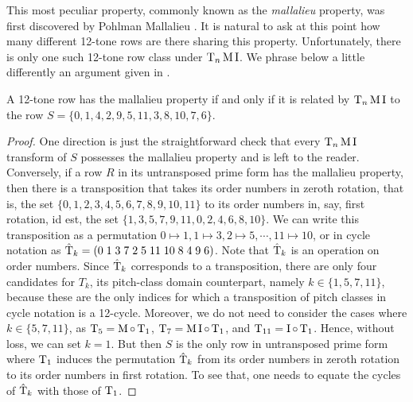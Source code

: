 This most peculiar property, commonly known as the \emph{mallalieu} property, was first discovered by Pohlman Mallalieu \cite[285]{Lewin1966}. It is natural to ask at this point how many different 12-tone rows are there sharing this property. Unfortunately, there is only one such 12-tone row class under $\operatorname{T}_n\operatorname{M}\operatorname{I}$. We phrase below a little differently an argument given in \cite[17]{Morris1976}.

\begin{proposition}
	\cite[17]{Morris1976}
	\label{morris-mallalieu}
	A 12-tone row has the mallalieu property if and only if it is related by $\operatorname{T}_n\operatorname{M}\operatorname{I}$ to the row $S = \{ 0, 1, 4, 2, 9, 5, 11, 3, 8, 10, 7, 6 \}$.
	\begin{proof}
		One direction is just the straightforward check that every $\operatorname{T}_n\operatorname{M}\operatorname{I}$ transform of $S$ possesses the mallalieu property and is left to the reader. Conversely, if a row $R$ in its untransposed prime form has the mallalieu property, then there is a transposition that takes its order numbers in zeroth rotation, that is, the set $\{ 0, 1, 2, 3, 4, 5, 6, 7, 8, 9, 10, 11 \}$ to its order numbers in, say, first rotation, id est, the set $\{ 1, 3, 5, 7, 9, 11, 0, 2, 4, 6, 8, 10 \}$. We can write this transposition as a permutation $0 \mapsto 1, 1 \mapsto 3, 2 \mapsto 5, \cdots, 11 \mapsto 10 $, or in cycle notation as $\hat{\operatorname{T}}_k = ( 0 \; 1 \; 3 \; 7 \; 2 \; 5 \; 11 \; 10 \; 8 \; 4 \; 9 \; 6 )$. Note that $\hat{\operatorname{T}}_k$ is an operation on order numbers. Since $\hat{\operatorname{T}}_k$ corresponds to a transposition, there are only four candidates for $T_k$, its pitch-class domain counterpart, namely $k \in \{ 1, 5, 7, 11 \}$, because these are the only indices for which a transposition of pitch classes in cycle notation is a 12-cycle. Moreover, we do not need to consider the cases where $k \in \{5, 7, 11\}$, as $\operatorname{T}_5 = \operatorname{M} \circ \operatorname{T}_1$, $\operatorname{T}_7 = \operatorname{M} \operatorname{I} \circ \operatorname{T}_1$, and $\operatorname{T}_{11} = \operatorname{I} \circ \operatorname{T}_1$. Hence, without loss, we can set $k = 1$. But then $S$ is the only row in untransposed prime form where $\operatorname{T}_1$ induces the permutation $\hat{\operatorname{T}}_k$ from its order numbers in zeroth rotation to its order numbers in first rotation. To see that, one needs to equate the cycles of $\hat{\operatorname{T}}_k$ with those of $\operatorname{T}_1$.
	\end{proof}
\end{proposition}

